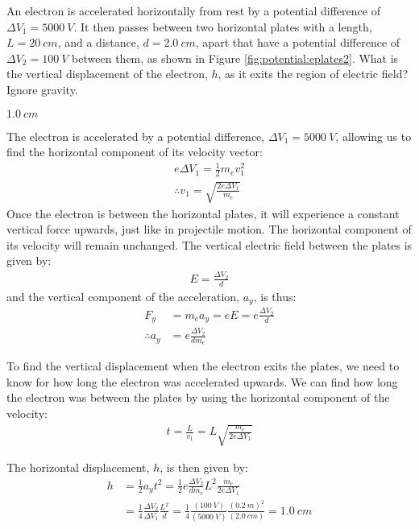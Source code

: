 \question An electron is accelerated horizontally from rest by a potential difference of $\Delta V_1=\SI{5000}{V}$. It then passes between two horizontal plates with a length, $L=\SI{20}{cm}$, and a distance, $d=\SI{2.0}{cm}$, apart that have a potential difference of $\Delta V_2=\SI{100}{V}$ between them, as shown in Figure \ref{fig:potential:eplates2}. What is the vertical displacement of the electron, $h$, as it exits the region of electric field? Ignore gravity.
\begin{finalanswer}
	$\SI{1.0}{cm}$
\end{finalanswer}
\begin{solution}
	The electron is accelerated by a potential difference, $\Delta V_1=\SI{5000}{V}$, allowing us to find the horizontal component of its velocity vector:
	\begin{align*}
	e\Delta V_1=\frac{1}{2}m_ev_1^2\\
	\therefore v_1=\sqrt{\frac{2e\Delta V_1}{m_e}}
	\end{align*}
	Once the electron is between the horizontal plates, it will experience a constant vertical force upwards, just like in projectile motion. The horizontal component of its velocity will remain unchanged. The vertical electric field between the plates is given by:
	\begin{align*}
	E=\frac{\Delta V_2}{d}
	\end{align*}
	and the vertical component of the acceleration, $a_y$, is thus:
	\begin{align*}
	F_y&=m_ea_y=eE=e\frac{\Delta V_2}{d}\\
	\therefore a_y&=e\frac{\Delta V_2}{dm_e}
	\end{align*}
	
	To find the vertical displacement when the electron exits the plates, we need to know for how long the electron was accelerated upwards. We can find how long the electron was between the plates by using the horizontal component of the velocity:
	\begin{align*}
	t=\frac{L}{v_1}=L\sqrt{\frac{m_e}{2e\Delta V_1}}
	\end{align*}
	
	The horizontal displacement, $h$, is then given by:
	\begin{align*}
	h &= \frac{1}{2}a_yt^2=\frac{1}{2}e\frac{\Delta V_2}{dm_e}L^2\frac{m_e}{2e\Delta V_1}\\
	&=\frac{1}{4}\frac{\Delta V_2}{\Delta V_1}\frac{L^2}{d}=\frac{1}{4}\frac{(\SI{100}{V})}{(\SI{5000}{V})}\frac{(\SI{0.2}{m})^2}{(\SI{2.0}{cm})}=\SI{1.0}{cm}
	\end{align*}
\end{solution}

